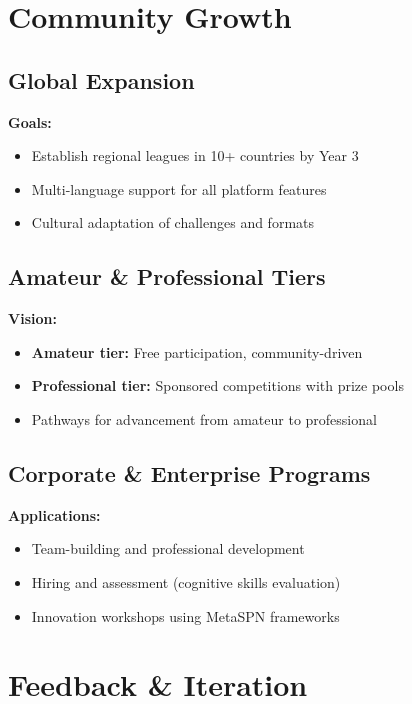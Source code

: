 \section{Community Growth}

\subsection{Global Expansion}

\textbf{Goals:}
\begin{itemize}[leftmargin=*]
  \item Establish regional leagues in 10+ countries by Year 3
  \item Multi-language support for all platform features
  \item Cultural adaptation of challenges and formats
\end{itemize}

\subsection{Amateur \& Professional Tiers}

\textbf{Vision:}
\begin{itemize}[leftmargin=*]
  \item \textbf{Amateur tier:} Free participation, community-driven
  \item \textbf{Professional tier:} Sponsored competitions with prize pools
  \item Pathways for advancement from amateur to professional
\end{itemize}

\subsection{Corporate \& Enterprise Programs}

\textbf{Applications:}
\begin{itemize}[leftmargin=*]
  \item Team-building and professional development
  \item Hiring and assessment (cognitive skills evaluation)
  \item Innovation workshops using MetaSPN frameworks
\end{itemize}

\section{Feedback \& Iteration}

